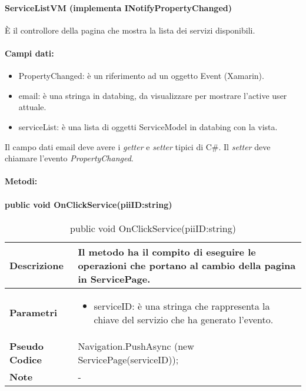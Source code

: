 \paragraph{ServiceListVM (implementa INotifyPropertyChanged)}
È il controllore della pagina che mostra la lista dei servizi disponibili.
\paragraph{Campi dati:}
\begin{itemize}
    \item PropertyChanged: è un riferimento ad un oggetto Event (Xamarin).
    \item email: è una stringa in databing, da visualizzare per mostrare l’active user attuale. 
    \item serviceList: è una lista di oggetti ServiceModel in databing con la vista.
\end{itemize}

Il campo dati email deve avere i \emph{getter} e \emph{setter} tipici di C\#. Il \emph{setter} deve chiamare l’evento \emph{PropertyChanged}.
\paragraph{Metodi:}




\paragraph{public void OnClickService(piiID:string)}
\begin{center}
    \begin{longtable}{|p{3cm}|p{9cm}|}%
    \caption{public void OnClickService(piiID:string)}
    \endfirsthead
    \endhead
    \hline
    \textbf{Descrizione} & Il metodo ha il compito di eseguire le operazioni che portano al cambio della pagina in ServicePage.\\
    \hline
    \textbf{Parametri} &      
    \begin{itemize}
        \item serviceID: è una stringa che rappresenta la chiave del  servizio che ha generato l’evento.
    \end{itemize}
    \\
    \hline
    \textbf{Pseudo Codice} & 
    Navigation.PushAsync (new ServicePage(serviceID));
    \\
    \hline
    \textbf{Note} & 
    -
    \\
    \hline
    \end{longtable}
\end{center}



